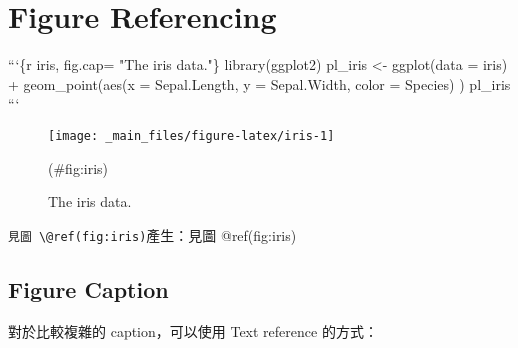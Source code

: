 \documentclass[oneside]{book}
\newenvironment{Shaded}{\begin{snugshade}}{\end{snugshade}}
\newcommand{\BaseNTok}[1]{\textcolor[rgb]{0.00,0.00,0.81}{#1}}
\newcommand{\NormalTok}[1]{#1}
\begin{document}
\hypertarget{figure-referencing}{%
\section{Figure Referencing}\label{figure-referencing}}

\begin{Shaded}
\begin{Highlighting}[]
\BaseNTok{```\{r iris, fig.cap= "The iris data."\}}
\BaseNTok{library(ggplot2)}
\BaseNTok{pl_iris <- ggplot(data = iris) +}
\BaseNTok{             geom_point(aes(x = Sepal.Length,}
\BaseNTok{                            y = Sepal.Width,}
\BaseNTok{                            color = Species)}
\BaseNTok{                        )}
\BaseNTok{pl_iris}
\BaseNTok{```}
\end{Highlighting}
\end{Shaded}

\begin{figure}

{\centering \texttt{[image: \_main\_files/figure-latex/iris-1]} 

}

\caption{The iris data.}(\#fig:iris)
\end{figure}

\texttt{見圖\ \textbackslash{}@ref(fig:iris)}產生：見圖 @ref(fig:iris)

\hypertarget{figure-caption}{%
\subsection{Figure Caption}\label{figure-caption}}

對於比較複雜的 caption，可以使用 Text reference 的方式：

\begin{Shaded}
\end{Shaded}
\end{document}
